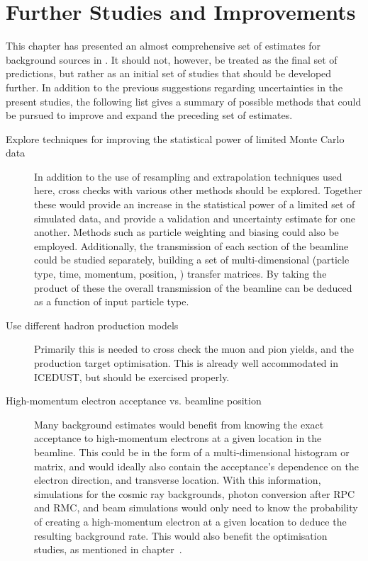 \section{Further Studies and Improvements}
This chapter has presented an almost comprehensive set of estimates for background sources in \phaseII.
It should not, however, be treated as the final set of predictions, but rather as an initial set of studies that should be developed further.
In addition to the previous suggestions regarding uncertainties in the present studies,
the following list gives a summary of possible methods that could be pursued to improve and expand the preceding set of estimates.

\begin{description}
	\item[Explore techniques for improving the statistical power of limited Monte Carlo data]
		In addition to the use of resampling and extrapolation techniques used here, cross checks with various other methods should be explored.
		Together these would provide an increase in the statistical power of a limited set of simulated data, and provide a validation and uncertainty estimate for one another.
		Methods such as particle weighting and biasing could also be employed.
		Additionally, the transmission of each section of the beamline could be studied separately, building a set of multi-dimensional (particle type, time, momentum, position, \etc) transfer matrices.
		By taking the product of these the overall transmission of the beamline can be deduced as a function of input particle type.
	\item[Use different hadron production models] Primarily this is needed to cross check the muon and pion yields, and the production target optimisation.
		This is already well accommodated in ICEDUST, but should be exercised properly.
	\item[High-momentum electron acceptance vs. beamline position] Many background estimates would benefit from knowing the exact acceptance to high-momentum electrons at a given location in the beamline.
		This could be in the form of a multi-dimensional histogram or matrix, and would ideally also contain the acceptance's dependence on the electron direction, and transverse location.
		With this information, simulations for the cosmic ray backgrounds, photon conversion after RPC and RMC, and beam simulations would only need to know the probability of creating a high-momentum electron at a given location to deduce the resulting background rate.
		This would also benefit the optimisation studies, as mentioned in chapter~.
\end{description}

